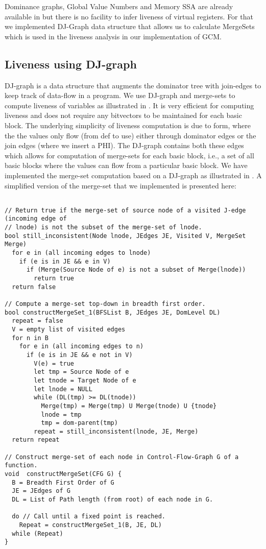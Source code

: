 \documentclass[acmlarge,review,anonymous]{acmart}\settopmatter{printfolios=true}
\begin{document}
Dominance graphs, Global Value Numbers and Memory SSA are already available in
\LLVM{} but there is no facility to infer liveness of virtual registers. For
that we implemented DJ-Graph data structure that allows us to calculate
MergeSets which is used in the liveness analysis in our implementation of GCM.

\subsection{Liveness using DJ-graph}
DJ-graph \cite{Sreedhar1996} is a data structure that augments the dominator
tree with join-edges to keep track of data-flow in a program. We use DJ-graph
and merge-sets to compute liveness of variables as illustrated in
\cite{das2012}.  It is very efficient for computing liveness and does not
require any bitvectors to be maintained for each basic block. The underlying
simplicity of liveness computation is due to \SSA{} form, where the the values
only flow (from def to use) either through dominator edges or the join edges
(where we insert a PHI). The DJ-graph contains both these edges which allows for
computation of merge-sets for each basic block, i.e., a set of all basic blocks
where the values can flow from a particular basic block. We have implemented the
merge-set computation based on a DJ-graph as illustrated in \cite{das2005}. A
simplified version of the merge-set that we implemented is presented here:

\begin{verbatim}

// Return true if the merge-set of source node of a visited J-edge (incoming edge of
// lnode) is not the subset of the merge-set of lnode.
bool still_inconsistent(Node lnode, JEdges JE, Visited V, MergeSet Merge)
  for e in (all incoming edges to lnode)
    if (e is in JE && e in V)
      if (Merge(Source Node of e) is not a subset of Merge(lnode))
        return true
  return false

// Compute a merge-set top-down in breadth first order.
bool constructMergeSet_1(BFSList B, JEdges JE, DomLevel DL)
  repeat = false
  V = empty list of visited edges
  for n in B
    for e in (all incoming edges to n)
      if (e is in JE && e not in V)
        V(e) = true
        let tmp = Source Node of e
        let tnode = Target Node of e
        let lnode = NULL
        while (DL(tmp) >= DL(tnode))
          Merge(tmp) = Merge(tmp) U Merge(tnode) U {tnode}
          lnode = tmp
          tmp = dom-parent(tmp)
        repeat = still_inconsistent(lnode, JE, Merge)
  return repeat

// Construct merge-set of each node in Control-Flow-Graph G of a function.
void  constructMergeSet(CFG G) {
  B = Breadth First Order of G
  JE = JEdges of G
  DL = List of Path length (from root) of each node in G.

  do // Call until a fixed point is reached.
    Repeat = constructMergeSet_1(B, JE, DL)
  while (Repeat)
}
\end{verbatim}
\end{document}
